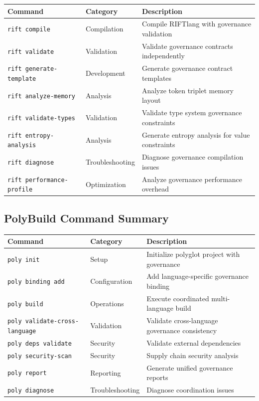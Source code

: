 \documentclass[11pt,letterpaper]{article}
\begin{document}
\begin{longtable}{|p{4cm}|p{3cm}|p{7cm}|}
\hline
\textbf{Command} & \textbf{Category} & \textbf{Description} \\
\hline
\endhead

\texttt{rift compile} & Compilation & Compile RIFTlang with governance validation \\
\hline
\texttt{rift validate} & Validation & Validate governance contracts independently \\
\hline
\texttt{rift generate-template} & Development & Generate governance contract templates \\
\hline
\texttt{rift analyze-memory} & Analysis & Analyze token triplet memory layout \\
\hline
\texttt{rift validate-types} & Validation & Validate type system governance constraints \\
\hline
\texttt{rift entropy-analysis} & Analysis & Generate entropy analysis for value constraints \\
\hline
\texttt{rift diagnose} & Troubleshooting & Diagnose governance compilation issues \\
\hline
\texttt{rift performance-profile} & Optimization & Analyze governance performance overhead \\
\hline
\end{longtable}

\subsection{PolyBuild Command Summary}

\begin{longtable}{|p{4cm}|p{3cm}|p{7cm}|}
\hline
\textbf{Command} & \textbf{Category} & \textbf{Description} \\
\hline
\endhead

\texttt{poly init} & Setup & Initialize polyglot project with governance \\
\hline
\texttt{poly binding add} & Configuration & Add language-specific governance binding \\
\hline
\texttt{poly build} & Operations & Execute coordinated multi-language build \\
\hline
\texttt{poly validate-cross-language} & Validation & Validate cross-language governance consistency \\
\hline
\texttt{poly deps validate} & Security & Validate external dependencies \\
\hline
\texttt{poly security-scan} & Security & Supply chain security analysis \\
\hline
\texttt{poly report} & Reporting & Generate unified governance reports \\
\hline
\texttt{poly diagnose} & Troubleshooting & Diagnose coordination issues \\
\hline
\end{longtable}
\end{document}
